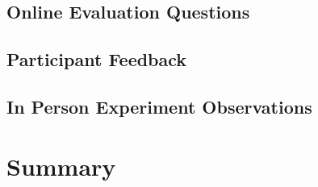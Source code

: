 \subsection{Online Evaluation Questions}

\subsection{Participant Feedback}

\subsection{In Person Experiment Observations}

\section{Summary}